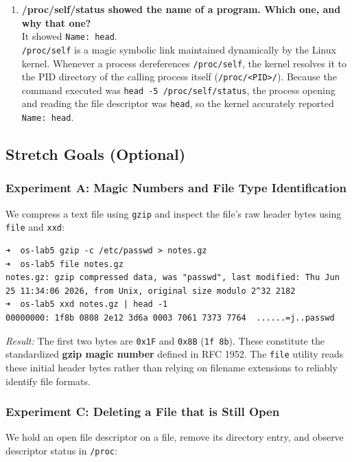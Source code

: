 \documentclass{labreport}
\begin{document}
\begin{enumerate}[leftmargin=*]
    \item \textbf{/proc/self/status showed the name of a program. Which one, and why that one?}\\[0.2em]
    It showed \texttt{Name: head}.\\
    \texttt{/proc/self} is a magic symbolic link maintained dynamically by the Linux kernel. Whenever a process dereferences \texttt{/proc/self}, the kernel resolves it to the PID directory of the calling process itself (\texttt{/proc/<PID>/}). Because the command executed was \texttt{head -5 /proc/self/status}, the process opening and reading the file descriptor was \texttt{head}, so the kernel accurately reported \texttt{Name: head}.
\end{enumerate}

\subsection{Stretch Goals (Optional)}

\subsubsection*{Experiment A: Magic Numbers and File Type Identification}
We compress a text file using \texttt{gzip} and inspect the file's raw header bytes using \texttt{file} and \texttt{xxd}:

\begin{lstlisting}[style=bash]
➜  os-lab5 gzip -c /etc/passwd > notes.gz
➜  os-lab5 file notes.gz
notes.gz: gzip compressed data, was "passwd", last modified: Thu Jun 25 11:34:06 2026, from Unix, original size modulo 2^32 2182
➜  os-lab5 xxd notes.gz | head -1
00000000: 1f8b 0808 2e12 3d6a 0003 7061 7373 7764  ......=j..passwd
\end{lstlisting}
\textit{Result:} The first two bytes are \texttt{0x1F} and \texttt{0x8B} (\texttt{1f 8b}). These constitute the standardized \textbf{gzip magic number} defined in RFC 1952. The \texttt{file} utility reads these initial header bytes rather than relying on filename extensions to reliably identify file formats.

\subsubsection*{Experiment C: Deleting a File that is Still Open}
We hold an open file descriptor on a file, remove its directory entry, and observe descriptor status in \texttt{/proc}:
\end{document}

